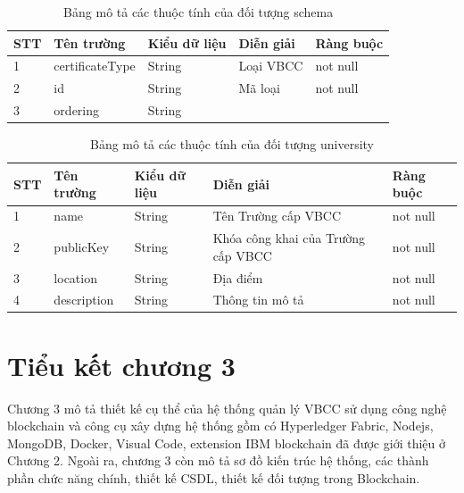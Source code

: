 \begin{enumerate}
\begin{table}[H]
\caption{Bảng mô tả các thuộc tính của đối tượng schema}
	\label{table:assetschema}
	\begin{tabularx} {\textwidth} {|p{1cm}|p{3cm}|p{3cm}|X|p{2cm}|}
\hline
		STT &	Tên trường & Kiểu dữ liệu & Diễn giải & Ràng buộc \\ \hline
		1 & certificateType	& String & Loại VBCC  & not null \\ \hline
		2 & id  & String  & Mã loại  & not null \\ \hline
		3 & ordering	&  String &   & \\ \hline
	\end{tabularx}
\end{table}


\begin{table}[H]
\caption{Bảng mô tả các thuộc tính của đối tượng university}
	\label{table:assetuniversity}
	\begin{tabularx} {\textwidth} {|p{1cm}|p{3cm}|p{3cm}|X|p{2cm}|}
\hline
		STT &	Tên trường & Kiểu dữ liệu & Diễn giải & Ràng buộc \\ \hline
		1 & name	& String & Tên Trường cấp VBCC  & not null \\ \hline
		2 & publicKey & String  & Khóa công khai của Trường cấp VBCC  & not null \\ \hline
		3 & location	&  String & Địa điểm  &not null \\ \hline
		4 & description	& String & Thông tin mô tả  &not null \\ \hline
\end{tabularx}
\end{table}

\end{enumerate}

\section{Tiểu kết chương 3}

Chương 3 mô tả thiết kế cụ thể của hệ thống quản lý VBCC sử dụng công nghệ blockchain và công cụ xây dựng hệ thống gồm có Hyperledger Fabric, Nodejs, MongoDB, Docker, Visual Code, extension IBM blockchain đã được giới thiệu ở Chương 2. Ngoài ra, chương 3 còn mô tả sơ đồ kiến trúc hệ thống, các thành phần chức năng chính, thiết kế CSDL, thiết kế đối tượng trong Blockchain. 
